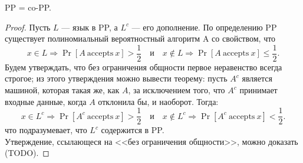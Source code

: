     

    \begin{Thm}
        PP = co-PP.
    \end{Thm}
    \begin{proof}
        Пусть $L$ --- язык в PP, а $L^c$ --- его дополнение. По определению PP существует полиномиальный вероятностный алгоритм A со свойством, что
        $$x \in L \Rightarrow \Pr [A \ {\text{accepts}} \ x] > {\frac{1}{2}} \quad {\text{и}} \quad x \not \in L \Rightarrow \Pr [A \ {\text{accepts}} \ x] \leq {\frac{1}{2}}.$$
        Будем утверждать, что без ограничения общности первое неравенство всегда строгое; из этого утверждения можно вывести теорему: пусть $A^{c}$ является машиной, которая такая же, как $A$, за исключением того, что $A^{c}$ принимает входные данные, когда $A$ отклонила бы, и наоборот. Тогда:
        $$x \in L^{c} \Rightarrow \Pr [A^{c} \ {\text{accepts}} \ x] > {\frac{1}{2}} \quad {\text{и}} \quad x \not \in L^{c} \Rightarrow \Pr [A^{c} \ {\text{accepts}} \ x] < {\frac{1}{2}}.$$
        что подразумевает, что $L^{c}$ содержится в PP.\\
        Утверждение, ссылающеся на <<без ограничения общности>>, можно доказать (TODO).
    \end{proof}

    
    
